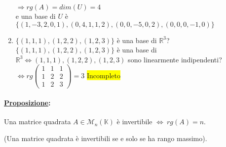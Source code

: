 \documentclass{article}
\newcommand{\hl}[1]{\colorbox{yellow}{#1}}
\newcommand{\ul}[1]{\underline{#1}}
\newcommand{\K}{\mathbb{K}}
\newcommand{\R}{\mathbb{R}}
\newcommand{\M}{\mathcal{M}}
\begin{document}
\begin{enumerate}
	  $\Rightarrow rg(A)=dim(U)=4$\\
	  e una base di $U$ è $\{(1,-3,2,0,1),(0,4,1,1,2),(0,0,-5,0,2),(0,0,0,-1,0)\}$
	\item $\{(1,1,1),(1,2,2),(1,2,3)\}$ è una base di $\R^3$?\\
	  $\{(1,1,1),(1,2,2),(1,2,3)\}$ è una base di $\R^3\Leftrightarrow(1,1,1),(1,2,2),(1,2,3)$ sono linearmente indipendenti?\\
	  $\Leftrightarrow rg\begin{pmatrix}
			1 & 1 & 1 \\
			1 & 2 & 2 \\
			1 & 2 & 3
		\end{pmatrix}=3$
	  \hl{Incompleto}
\end{enumerate}
\paragraph*{\ul{Proposizione}:} Una matrice quadrata $A\in\M_n(\K)$ è invertibile $\Leftrightarrow\ rg(A)=n$.

\hspace*{6em}(Una matrice quadrata è invertibili se e solo se ha rango massimo).
\end{document}
